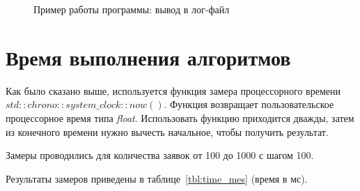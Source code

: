 \begin{figure}[H]
	\caption{Пример работы программы: вывод в лог-файл}
	\label{img:run2}
\end{figure}

\section{Время выполнения алгоритмов}

Как было сказано выше, используется функция замера процессорного времени $std::chrono::system\_clock::now()$. Функция возвращает пользовательское процессорное время типа \textit{float}.
Использовать функцию приходится дважды, затем из конечного времени нужно вычесть начальное, чтобы получить результат.

Замеры проводились для количества заявок от 100 до 1000 с шагом 100.

Результаты замеров приведены в таблице~\ref{tbl:time_mes} (время в мс).

